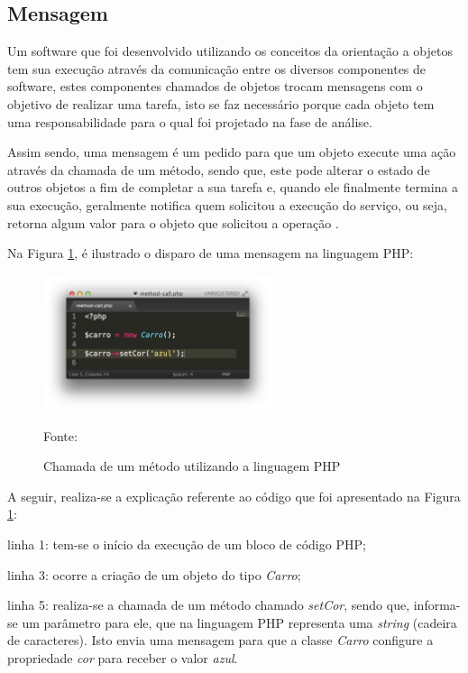 \subsection{Mensagem}

Um software que foi desenvolvido utilizando os conceitos da orientação a
objetos tem sua execução através da comunicação entre os diversos componentes
de software, estes componentes chamados de objetos trocam mensagens com o
objetivo de realizar uma tarefa, isto se faz necessário porque cada objeto  tem
uma responsabilidade para o qual foi projetado na fase de análise.

Assim sendo, uma mensagem é um pedido para que um objeto execute uma ação
através da chamada de um método, sendo que, este pode alterar o estado de
outros objetos a fim de completar a sua tarefa e, quando ele finalmente termina
a sua execução, geralmente notifica quem solicitou a execução do serviço, ou
seja, retorna algum valor para o objeto que solicitou a operação
\cite{c++ComoProgramar}.

Na Figura \ref{fig:mensagem}, é ilustrado o disparo de uma mensagem na linguagem
\acs{PHP}:

\begin{figure}[h!tb]
	\caption{Chamada de um método utilizando a linguagem PHP}
	\label{fig:mensagem}

	\centering
	\includegraphics[width=0.6\textwidth]{images/method-call.png}

	\centering
	\footnotesize Fonte: \fonteOAutor
\end{figure}

\FloatBarrier 	%

A seguir, realiza-se a explicação referente ao código que foi
apresentado na Figura \ref{fig:mensagem}:

\begin{alineas}
    \item linha 1: tem-se o início da execução de um bloco de código
    \acs{PHP};
    \item linha 3: ocorre a criação de um objeto do tipo \textit{Carro};
    \item linha 5: realiza-se a chamada de um método chamado
    \textit{setCor}, sendo que, informa-se um parâmetro para ele, que na
    linguagem \acs{PHP} representa uma \textit{string} (cadeira de caracteres).
    Isto envia uma mensagem para que a classe \textit{Carro} configure
    a propriedade \textit{cor} para receber o valor \textit{azul}.
\end{alineas}

